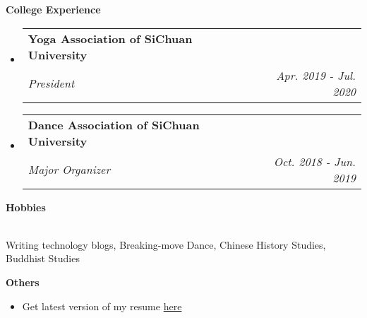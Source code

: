 \documentclass[letterpaper,11pt]{article}
\makeatletter
\newcommand{\resheading}[1]{{\large \colorbox{mygrey}{\begin{minipage}{\textwidth}{\textbf{#1 \vphantom{p\^{E}}}}\end{minipage}}}}
\newcommand{\ressubheading}[4]{
\begin{tabular*}{7.0in}{l@{\extracolsep{\fill}}r}
		\textbf{#1} & #2 \\
		\textit{#3} & \textit{#4} \\
\end{tabular*}\vspace{-6pt}}
\makeatother
\begin{document}
\resheading{College Experience}
\begin{itemize}
\item
	\ressubheading{Yoga Association of SiChuan University}{}{President}{Apr. 2019 - Jul. 2020}
\item
	\ressubheading{Dance Association of SiChuan University}{}{Major Organizer}{Oct. 2018 - Jun. 2019}
\end{itemize}


\resheading{Hobbies}
\\[9pt]
Writing technology blogs, \quad Breaking-move Dance, \quad Chinese History Studies, \quad Buddhist Studies
\\[12pt]

\resheading{Others}
\begin{itemize}
    \item Get latest version of my resume \href{https://github.com/Dynmi/Dynmi.github.io/blob/master/resume_wanghan_EN.pdf}{here} 
\end{itemize}
\end{document}
